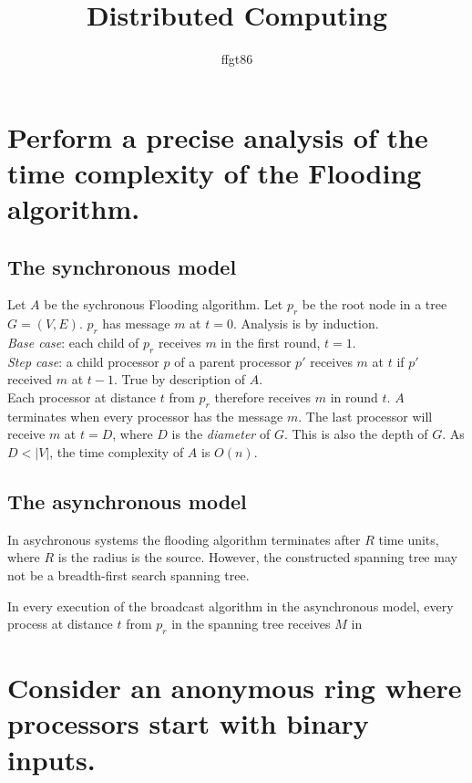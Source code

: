 \documentclass[11pt]{article} %
\title{Distributed Computing}
\author{ffgt86}
\begin{document}
\maketitle

\section{Perform a precise analysis of the time complexity of the Flooding algorithm.}
\subsection{The synchronous model}

Let $A$ be the sychronous Flooding algorithm.
Let $p_r$ be the root node in a tree $G = (V, E)$. $p_r$ has message $m$ at $t = 0$. Analysis is by induction.\\

\noindent
\textit{Base case}: each child of $p_r$ receives $m$ in the first round, $t = 1$.\\
\textit{Step case}: a child processor $p$ of a parent processor $p'$ receives $m$ at $t$ if $p'$ received $m$ at $t - 1$. True by description of $A$. \\

Each processor at distance $t$ from $p_r$ therefore receives $m$ in round $t$. $A$ terminates when every processor has the message $m$. The last processor will receive $m$ at $t = D$, where $D$ is the \textit{diameter} of $G$. This is also the depth of $G$. As $D < |V|$, the time complexity of $A$ is $O(n)$.

\subsection{The asynchronous model}

In asychronous systems the flooding algorithm terminates after $R$ time units, where $R$ is the radius is the source. However, the constructed spanning tree may not be a breadth-first search spanning tree. 

In every execution of the broadcast algorithm in the asynchronous model, every process at distance $t$ from $p_r$ in the spanning tree receives $M$ in 

\section{Consider an anonymous ring where processors start with binary inputs.}
\end{document}
